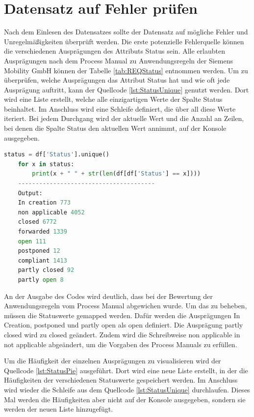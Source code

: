 \section{Datensatz auf Fehler prüfen}
Nach dem Einlesen des Datensatzes sollte der Datensatz auf mögliche Fehler und Unregelmäßigkeiten überprüft werden. 
Die erste potenzielle Fehlerquelle können die verschiedenen Ausprägungen des Attributs Status sein. Alle erlaubten Ausprägungen nach dem 
Process Manual zu Anwendungsregeln der Siemens Mobility GmbH können der Tabelle \ref*{tab:REQStatus} entnommen werden. Um zu überprüfen, welche Ausprägungen
das Attribut Status hat und wie oft jede Ausprägung auftritt, kann der Quellcode \ref*{lst:StatusUnique} genutzt werden. Dort wird eine Liste erstellt,
welche alle einzigartigen Werte der Spalte Status beinhaltet. Im Anschluss wird eine Schleife definiert, die über all diese Werte iteriert.
Bei jedem Durchgang wird der aktuelle Wert und die Anzahl an Zeilen, bei denen die Spalte Status den aktuellen Wert annimmt, auf der Konsole ausgegeben.

\begin{lstlisting}[language = python, caption={Häufigkeit der Ausprägungen von Status bestimmen},captionpos=b, label = lst:StatusUnique, floatplacement=H]
    status = df['Status'].unique()
    for x in status:
        print(x + " " + str(len(df[df['Status'] == x])))
    ---------------------------------------
    Output:
    In creation 773
    non applicable 4052
    closed 6772
    forwarded 1339
    open 111
    postponed 12
    compliant 1413
    partly closed 92
    partly open 8
\end{lstlisting}

An der Ausgabe des Codes wird deutlich, dass bei der Bewertung der Anwendungsregeln vom Process Manual abgewichen wurde. Um das zu beheben, müssen die Statuswerte gemapped werden.
Dafür werden die Ausprägungen \glqq In Creation\grqq{}, \glqq postponed\grqq{} und \glqq partly open\grqq{} als \glqq open\grqq{} definiert.
Die Ausprägung \glqq partly closed\grqq{} wird zu \glqq closed\grqq{} geändert. Zudem wird die Schreibweise \glqq non applicable\grqq{} in \glqq not applicable\grqq{} abgeändert,
um die Vorgaben des Process Manuals zu erfüllen. 

Um die Häufigkeit der einzelnen Ausprägungen zu visualisieren wird der Quellcode \ref*{lst:StatusPie} ausgeführt.
Dort wird eine neue Liste erstellt, in der die Häufigkeiten der verschiedenen Statuswerte gespeichert werden.
Im Anschluss wird wieder die Schleife aus dem Quellcode \ref*{lst:StatusUnique} durchlaufen. Dieses Mal werden die Häufigkeiten aber nicht auf der Konsole ausgegeben,
sondern sie werden der neuen Liste hinzugefügt.

